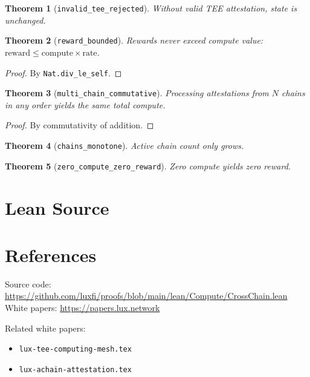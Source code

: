 \documentclass[11pt]{article}
\newtheorem{theorem}{Theorem}
\begin{document}
\begin{theorem}[\texttt{invalid\_tee\_rejected}]
Without valid TEE attestation, state is unchanged.
\end{theorem}

\begin{theorem}[\texttt{reward\_bounded}]
Rewards never exceed compute value: $\text{reward} \leq \text{compute} \times \text{rate}$.
\end{theorem}
\begin{proof}
By \texttt{Nat.div\_le\_self}.
\end{proof}

\begin{theorem}[\texttt{multi\_chain\_commutative}]
Processing attestations from $N$ chains in any order yields the same total compute.
\end{theorem}
\begin{proof}
By commutativity of addition.
\end{proof}

\begin{theorem}[\texttt{chains\_monotone}]
Active chain count only grows.
\end{theorem}

\begin{theorem}[\texttt{zero\_compute\_zero\_reward}]
Zero compute yields zero reward.
\end{theorem}


\section{Lean Source}


\section{References}
\noindent Source code: \url{https://github.com/luxfi/proofs/blob/main/lean/Compute/CrossChain.lean}\\
\noindent White papers: \url{https://papers.lux.network}

\noindent Related white papers:
\begin{itemize}
  \item \texttt{lux-tee-computing-mesh.tex}
  \item \texttt{lux-achain-attestation.tex}
\end{itemize}
\end{document}
